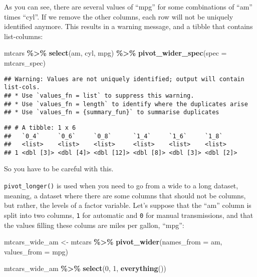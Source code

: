 \documentclass[
]{article}
\newenvironment{Shaded}{\begin{snugshade}}{\end{snugshade}}
\newcommand{\DataTypeTok}[1]{\textcolor[rgb]{0.13,0.29,0.53}{#1}}
\newcommand{\KeywordTok}[1]{\textcolor[rgb]{0.13,0.29,0.53}{\textbf{#1}}}
\newcommand{\NormalTok}[1]{#1}
\newcommand{\OperatorTok}[1]{\textcolor[rgb]{0.81,0.36,0.00}{\textbf{#1}}}
\newcommand{\StringTok}[1]{\textcolor[rgb]{0.31,0.60,0.02}{#1}}
\begin{document}
As you can see, there are several values of ``mpg'' for some combinations of ``am'' times ``cyl''. If
we remove the other columns, each row will not be uniquely identified anymore. This results in a
warning message, and a tibble that contains list-columns:

\begin{Shaded}
\begin{Highlighting}[]
\NormalTok{mtcars }\OperatorTok{\%\textgreater{}\%}\StringTok{ }
\StringTok{  }\KeywordTok{select}\NormalTok{(am, cyl, mpg) }\OperatorTok{\%\textgreater{}\%}\StringTok{ }
\StringTok{  }\KeywordTok{pivot\_wider\_spec}\NormalTok{(}\DataTypeTok{spec =}\NormalTok{ mtcars\_spec)}
\end{Highlighting}
\end{Shaded}

\begin{verbatim}
## Warning: Values are not uniquely identified; output will contain list-cols.
## * Use `values_fn = list` to suppress this warning.
## * Use `values_fn = length` to identify where the duplicates arise
## * Use `values_fn = {summary_fun}` to summarise duplicates
\end{verbatim}

\begin{verbatim}
## # A tibble: 1 x 6
##   `0_4`     `0_6`     `0_8`      `1_4`     `1_6`     `1_8`    
##   <list>    <list>    <list>     <list>    <list>    <list>   
## 1 <dbl [3]> <dbl [4]> <dbl [12]> <dbl [8]> <dbl [3]> <dbl [2]>
\end{verbatim}

So you have to be careful with this.

\texttt{pivot\_longer()} is used when you need to go from a wide to a long dataset, meaning, a dataset where
there are some columns that should not be columns, but rather, the levels of a factor variable.
Let's suppose that the ``am'' column is split into two columns, \texttt{1} for
automatic and \texttt{0} for manual transmissions, and that the values filling these colums are miles per
gallon, ``mpg'':

\begin{Shaded}
\begin{Highlighting}[]
\NormalTok{mtcars\_wide\_am \textless{}{-}}\StringTok{ }\NormalTok{mtcars }\OperatorTok{\%\textgreater{}\%}\StringTok{ }
\StringTok{  }\KeywordTok{pivot\_wider}\NormalTok{(}\DataTypeTok{names\_from =}\NormalTok{ am, }\DataTypeTok{values\_from =}\NormalTok{ mpg)}

\NormalTok{mtcars\_wide\_am }\OperatorTok{\%\textgreater{}\%}\StringTok{ }
\StringTok{  }\KeywordTok{select}\NormalTok{(}\StringTok{\textasciigrave{}}\DataTypeTok{0}\StringTok{\textasciigrave{}}\NormalTok{, }\StringTok{\textasciigrave{}}\DataTypeTok{1}\StringTok{\textasciigrave{}}\NormalTok{, }\KeywordTok{everything}\NormalTok{())}
\end{Highlighting}
\end{Shaded}
\end{document}

